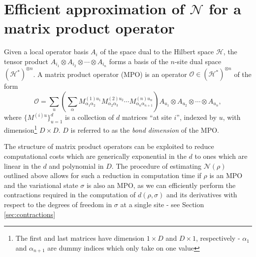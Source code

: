 \documentclass{article}
\begin{document}
\section{Efficient approximation of $\mathcal N$ for a matrix product operator}

Given a local operator basis $A_i$ of the space dual to the Hilbert space $\mathcal H$, the tensor product $A_{i_1}\otimes A_{i_2}\otimes\cdots\otimes A_{i_n}$ forms a basis of the $n$-site dual space $(\mathcal H^*)^{\otimes n}$. A matrix product operator (MPO) is an operator $\mathcal O\in (\mathcal H^*)^{\otimes n}$ of the form
\begin{equation}\mathcal O=\sum_u\left(\sum_{\alpha}M_{\alpha_1\alpha_2}^{(1)u_1}M_{\alpha_2\alpha_3}^{(2)u_2}\cdots M_{\alpha_n\alpha_{n+1}}^{(n)u_n}\right)A_{u_1}\otimes A_{u_2}\otimes\cdots\otimes A_{u_n},\end{equation}
where $\{M^{(i)u}\}_{u=1}^d$ is a collection of $d$ matrices ``at site $i$'', indexed by $u$, with dimension\footnote{The first and last matrices have dimension $1\times D$ and $D\times 1$, respectively - $\alpha_1$ and $\alpha_{n+1}$ are dummy indices which only take on one value} $D\times D$. $D$ is referred to as the \textit{bond dimension} of the MPO.

% 

The structure of matrix product operators can be exploited to reduce computational costs which are generically exponential in the $d$ to ones which are linear in the $d$ and polynomial in $D$. The procedure of estimating $\mathcal N(\rho)$ outlined above allows for such a reduction in computation time if $\rho$ is an MPO and the variational state $\sigma$ is also an MPO, as we can efficiently perform the contractions required in the computation of $d(\rho,\sigma)$ and its derivatives with respect to the degrees of freedom in $\sigma$ at a single site - see Section \ref{sec:contractions}
\end{document}

